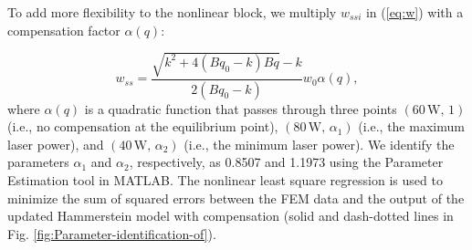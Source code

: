 \documentclass [11pt, proquest] {uwthesis}[2020/02/24]
\begin{document}
To add more flexibility to the nonlinear block, we multiply $w_{ssi}$
in (\ref{eq:w}) with a compensation factor $\alpha(q)$:

\begin{equation}
w_{ss}=\frac{\sqrt{k^{2}+4(Bq_{0}-k)Bq}-k}{2(Bq_{0}-k)}w_{0}\alpha(q),\label{eq:w-1}
\end{equation}
where $\alpha(q)$ is a quadratic function that passes through three
points $(60\,\text{W},\,1)$ (i.e., no compensation at the equilibrium
point), $(80\,\text{W},\,\alpha_{1})$ (i.e., the maximum laser power),
and $(40\,\text{W},\,\alpha_{2})$ (i.e., the minimum laser power).
We identify the parameters $\alpha_{1}$ and $\alpha_{2}$, respectively,
as 0.8507 and 1.1973 using the Parameter Estimation tool in MATLAB.
The nonlinear least square regression is used to minimize the sum
of squared errors between the FEM data and the output of the updated
Hammerstein model with compensation (solid and dash-dotted lines in
Fig. \ref{fig:Parameter-identification-of}).
\end{document}
